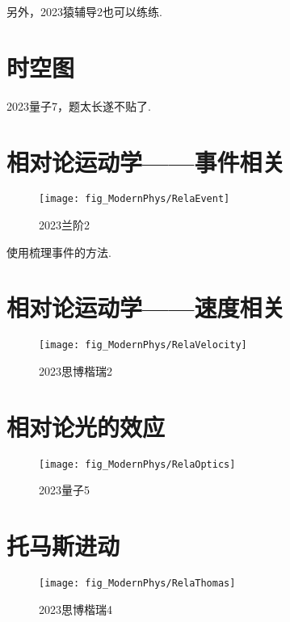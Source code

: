 \documentclass[a4paper]{article}
\begin{document}
	另外，2023猿辅导2也可以练练.
	\section{时空图}
	2023量子7，题太长遂不贴了.
	
	\section{相对论运动学——事件相关}
	\begin{figure}[H]
		\centering
		\texttt{[image: fig\_ModernPhys/RelaEvent]}
		\caption{2023兰阶2}
		\label{fig:relaevent}
	\end{figure}
	使用梳理事件的方法.
	\section{相对论运动学——速度相关}
	\begin{figure}[H]
		\centering
		\texttt{[image: fig\_ModernPhys/RelaVelocity]}
		\caption{2023思博楷瑞2}
		\label{fig:relavelocity}
	\end{figure}
	
	\section{相对论光的效应}
	\begin{figure}[H]
		\centering
		\texttt{[image: fig\_ModernPhys/RelaOptics]}
		\caption{2023量子5}
		\label{fig:relaoptics}
	\end{figure}
	
	\section{托马斯进动}
	\begin{figure}[H]
		\centering
		\texttt{[image: fig\_ModernPhys/RelaThomas]}
		\caption{2023思博楷瑞4}
		\label{fig:relathomas}
	\end{figure}
	
\end{document}
